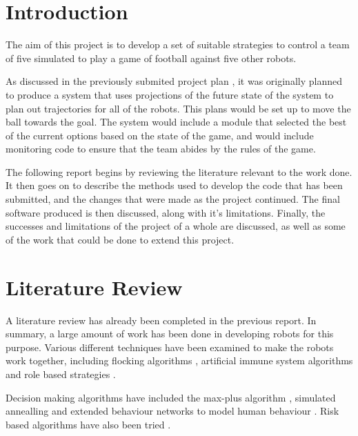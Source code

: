 \documentclass[10pt]{article}
\begin{document}


\section{Introduction}

The aim of this project is to develop a set of suitable strategies to control a
team of five simulated to play a game of football against five other robots.

As discussed in the previously submited project plan \cite{pplr}, it was
originally planned to produce a system that uses projections of the future state
of the system to plan out trajectories for all of the robots.  This plans would
be set up to move the ball towards the goal.  The system would include a module
that selected the best of the current options based on the state of the game,
and would include monitoring code to ensure that the team abides by the rules of
the game.

The following report begins by reviewing the literature relevant to the work
done.  It then goes on to describe the methods used to develop the code that has
been submitted, and the changes that were made as the project continued. The
final software produced is then discussed, along with it's limitations. Finally,
the successes and limitations of the project of a whole are discussed, as well
as some of the work that could be done to extend this project.

\section{Literature Review}

A literature review has already been completed in the previous report.  In
summary, a large amount of work has been done in developing robots for this
purpose.  Various different techniques have been examined to make the robots
work together, including flocking algorithms \cite{taskBasedFlocking},
artificial immune system algorithms \cite{artificialImmuneSystemCooperation} and
role based strategies \cite{taskRoleSelectionStrategy}
\cite{multiagentsDynamicBoxChange}.

Decision making algorithms have included the max-plus algorithm
\cite{maxPlusAlgorithm}, simulated annealling
\cite{simulatedAnnealingDecisionMaking} and extended behaviour networks to model
human behaviour \cite{modellingHumanDecisionMaking}. Risk based algorithms have
also been tried \cite{balancingGainsRisksCostsPassing}.
\end{document}
